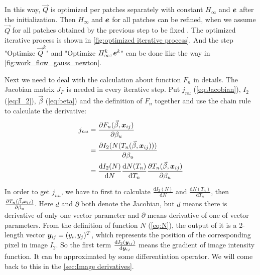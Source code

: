 In this way, $\vec{Q}$ is optimized per patches separately with constant $H_\infty$ and $\boldsymbol{e}$ after the initialization. Then $H_\infty$ and $\boldsymbol{e}$ for all patches can be refined, when we assume $\vec{Q}$ for all patches obtained by the previous step to be fixed . The optimized iterative process is shown in \cref{fig:optimized iterative process}. And the step "Optimize $\vec{Q}^k$" and "Optimize $H_\infty^{k}, \boldsymbol{e}^k$" can be done like the way in \cref{fig:work_flow_gauss_newton}.

Next we need to deal with the calculation about function $F_n$ in details. The Jacobian matrix $J_F$ is needed in every iterative step. Put $j_{nu}$ (\cref{eq:Jacobian}), $I_2$ (\cref{eq:I_2}), $\vec{\beta}$ (\cref{eq:beta}) and the definition of $F_n$ together and use the chain rule to calculate the derivative:
\begin{align}\label{eq:jnuR}
	j_{nu} &= \frac{\partial F_n(\vec{\beta}, \boldsymbol{x}_{ij})}{\partial \beta_u} \nonumber \\
				&= \frac{\partial I_2(N(T_n(\vec{\beta}, \boldsymbol{x}_{ij})))}{\partial \beta_u} \nonumber \\
				&= \frac{\mathrm{d} I_2(N)}{\mathrm{d}N} \frac{\mathrm{d} N(T_n)}{\mathrm{d} T_n} \frac{\partial T_n(\vec{\beta}, \boldsymbol{x}_{ij})}{\partial \beta_u} 
\end{align}

In order to get $j_{nu}$, we have to first to calculate $ \frac{\mathrm{d} I_2(N)}{\mathrm{d}N}$ and  $\frac{\mathrm{d} N(T_n)}{\mathrm{d} T_n}$, then $\frac{\partial T_n(\vec{\beta}, \boldsymbol{x}_{ij})}{\partial \beta_u}$. Here $d$ and $\partial $ both denote the Jacobian, but $d$ means there is derivative of only one vector parameter and $\partial$ means derivative of one of vector parameters. From the definition of function $N$ (\cref{eq:N}), the output of it is a 2-length vector $\boldsymbol{y}_{ij} = (y_i, y_j)^T$, which represents the position of the corresponding pixel in image $I_2$. So the first term $\frac{\mathrm{d} I_2(\boldsymbol{y}_{ij})}{\mathrm{d}\boldsymbol{y}_{ij}}$ means the gradient of image intensity function. It can be approximated by some differentiation operator. We will come back to this in the \cref{sec:Image derivatives}.


